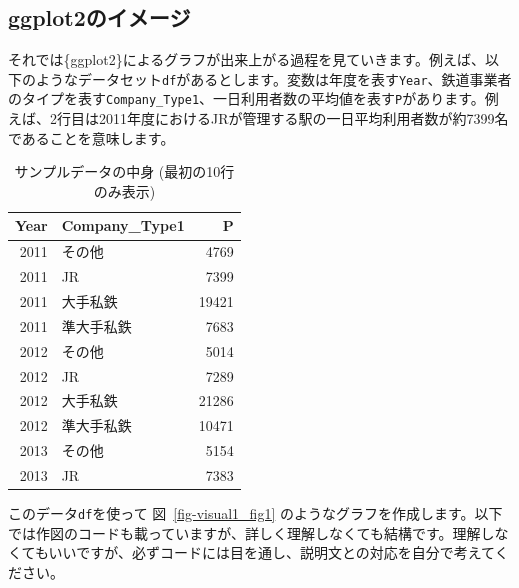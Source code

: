 \documentclass[
  a4paper,
  pandoc,
  ja=standard,
  jafont=haranoaji]{bxjsbook}
\begin{document}
\hypertarget{ggplot2ux306eux30a4ux30e1ux30fcux30b8}{%
\subsection{ggplot2のイメージ}\label{ggplot2ux306eux30a4ux30e1ux30fcux30b8}}

それでは\{ggplot2\}によるグラフが出来上がる過程を見ていきます。例えば、以下のようなデータセット\texttt{df}があるとします。変数は年度を表す\texttt{Year}、鉄道事業者のタイプを表す\texttt{Company\_Type1}、一日利用者数の平均値を表す\texttt{P}があります。例えば、2行目は2011年度におけるJRが管理する駅の一日平均利用者数が約7399名であることを意味します。

\hypertarget{tbl-visual1_stationdata}{}
\begin{table}
\caption{\label{tbl-visual1_stationdata}サンプルデータの中身 (最初の10行のみ表示) }

\centering
\begin{tabular}{r|l|r}
\hline
Year & Company\_Type1 & P\\
\hline
2011 & その他 & 4769\\
\hline
2011 & JR & 7399\\
\hline
2011 & 大手私鉄 & 19421\\
\hline
2011 & 準大手私鉄 & 7683\\
\hline
2012 & その他 & 5014\\
\hline
2012 & JR & 7289\\
\hline
2012 & 大手私鉄 & 21286\\
\hline
2012 & 準大手私鉄 & 10471\\
\hline
2013 & その他 & 5154\\
\hline
2013 & JR & 7383\\
\hline
\end{tabular}
\end{table}

このデータ\texttt{df}を使って 図~\ref{fig-visual1_fig1}
のようなグラフを作成します。以下では作図のコードも載っていますが、詳しく理解しなくても結構です。理解しなくてもいいですが、必ずコードには目を通し、説明文との対応を自分で考えてください。
\end{document}

